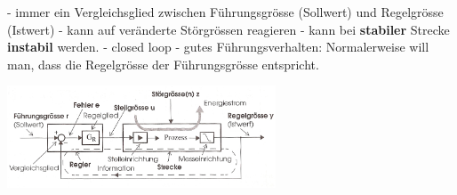 \begin{description}[leftmargin=2.5cm]
\begin{minipage}{8cm}
 				 - immer ein Vergleichsglied zwischen Führungsgrösse (Sollwert) und
 				 Regelgrösse (Istwert) \newline
 				 - kann auf veränderte Störgrössen reagieren \newline
 				 - kann bei \textbf{stabiler} Strecke \textbf{instabil} werden. \newline
				 - closed loop
				 - gutes Führungsverhalten: Normalerweise will man, dass die Regelgrösse der Führungsgrösse entspricht.
\end{minipage}
\begin{minipage}{8cm}
\includegraphics[width=8cm]{./bilder/Grundregelkreis_klein.jpg}
\end{minipage}				
				
\end{description}

